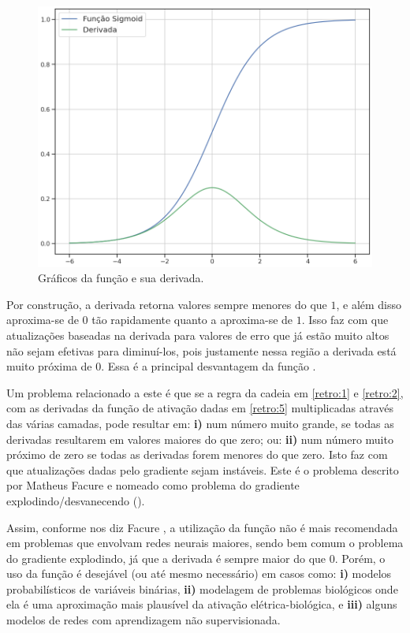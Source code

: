 \begin{figure}[htb]
\centering
\includegraphics[width=12cm]{figuras/der_sigm}
\caption{Gráficos da função  e sua derivada.}
\label{fig:der_sigm}
\end{figure}

Por construção, a derivada retorna valores sempre menores do que $1$, e além disso aproxima-se de $0$ tão rapidamente quanto a  aproxima-se de $1$. Isso faz com que atualizações baseadas na derivada para valores de erro que já estão muito altos não sejam efetivas para diminuí-los, pois justamente nessa região a derivada está muito próxima de $0$. Essa é a principal desvantagem da função .

Um problema relacionado a este é que se a regra da cadeia em \ref{retro:1} e \ref{retro:2}, com as derivadas da função de ativação dadas em \ref{retro:5} multiplicadas através das várias camadas, pode resultar em: \textbf{i)} num número muito grande, se todas as derivadas resultarem em valores maiores do que zero; ou: \textbf{ii)} num número muito próximo de zero se todas as derivadas forem menores do que zero. Isto faz com que atualizações dadas pelo gradiente sejam instáveis. Este é o problema descrito por Matheus Facure \citep{matheus_2} e nomeado como problema do gradiente explodindo/desvanecendo ().

Assim, conforme nos diz Facure \citep{matheus}, a utilização da função  não é mais recomendada em problemas que envolvam redes neurais maiores, sendo bem comum o problema do gradiente explodindo, já que a derivada é sempre maior do que $0$. Porém, o uso da função  é desejável (ou até mesmo necessário) em casos como: \textbf{i)} modelos probabilísticos de variáveis binárias, \textbf{ii)} modelagem de problemas biológicos onde ela é uma aproximação mais plausível da ativação elétrica-biológica, e \textbf{iii)} alguns modelos de redes com aprendizagem não supervisionada.

